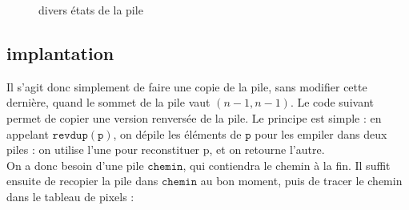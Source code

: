 \documentclass[11pt,a4paper]{article}
\begin{document}
\begin{figure}[h]
	\begin{center}

\hspace{2cm}
	\caption{divers états de la pile}
	\end{center}
\end{figure}

\subsection{implantation}

Il s'agit donc simplement de faire une copie de la pile, sans modifier cette dernière, quand le sommet de la pile vaut $(n-1,n-1)$. Le code suivant permet de copier une version renversée de la pile. Le principe est simple : en appelant $\mathtt{revdup(p)}$, on dépile les éléments de $\mathtt{p}$ pour les empiler dans deux piles : on utilise l'une pour reconstituer p, et on retourne l'autre.\\



On a donc besoin d'une pile $\mathtt{chemin}$, qui contiendra le chemin à la fin. Il suffit ensuite de recopier la pile dans $\mathtt{chemin}$ au bon moment, puis de tracer le chemin dans le tableau de pixels :



\end{document}
